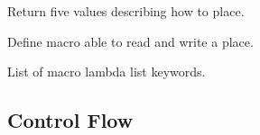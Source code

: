 \begin{LIST}{1cm}
  {
  Return five values describing how to  place.
  }

  {
  Define macro  able to read and write a place.
  }

  {List of macro lambda list keywords.
    }

\end{LIST}


\subsection{Control Flow}
